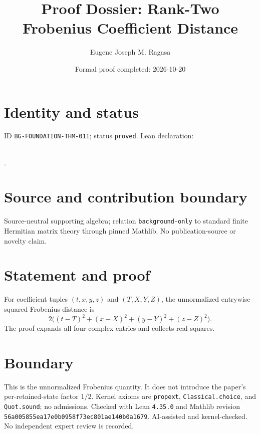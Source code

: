 \documentclass[11pt]{article}
\title{Proof Dossier: Rank-Two Frobenius Coefficient Distance}\author{Eugene Joseph M. Ragasa}\date{Formal proof completed: 2026-10-20}
\begin{document}
\maketitle
\section{Identity and status}
ID \texttt{BG-FOUNDATION-THM-011}; status \texttt{proved}. Lean declaration:
\par{}\\
{\tiny{}}.
\section{Source and contribution boundary}
Source-neutral supporting algebra; relation \texttt{background-only} to standard finite
Hermitian matrix theory through pinned Mathlib. No publication-source or novelty claim.
\section{Statement and proof}
For coefficient tuples $(t,x,y,z)$ and $(T,X,Y,Z)$, the unnormalized entrywise squared
Frobenius distance is
\[
2\bigl((t-T)^2+(x-X)^2+(y-Y)^2+(z-Z)^2\bigr).
\]
The proof expands all four complex entries and collects real squares.
\section{Boundary}
This is the unnormalized Frobenius quantity. It does not introduce the paper's
per-retained-state factor $1/2$. Kernel axioms are \texttt{propext}, \texttt{Classical.choice}, and \texttt{Quot.sound}; no admissions. Checked with Lean \texttt{4.35.0} and Mathlib revision \texttt{56a005855ea17e0b0958f73ec801ae140b0a1679}. AI-assisted and kernel-checked. No independent expert review is recorded.
\end{document}
